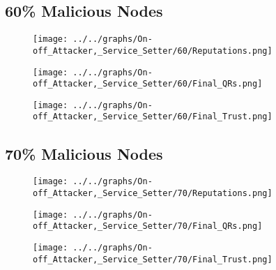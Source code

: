 \begin{minipage}[t]{0.49\columnwidth}
\subsection*{60\% Malicious Nodes}
    \begin{figure}[H]
        \centering
        \texttt{[image: ../../graphs/On-off\_Attacker,\_Service\_Setter/60/Reputations.png]}
    \end{figure}
    \begin{figure}[H]
        \centering
        \texttt{[image: ../../graphs/On-off\_Attacker,\_Service\_Setter/60/Final\_QRs.png]}
    \end{figure}
\end{minipage}
\begin{minipage}[t]{0.49\columnwidth}
    \begin{figure}[H]
        \centering
        \texttt{[image: ../../graphs/On-off\_Attacker,\_Service\_Setter/60/Final\_Trust.png]}
    \end{figure}
\end{minipage}

\begin{minipage}[t]{0.49\columnwidth}
\subsection*{70\% Malicious Nodes}
    \begin{figure}[H]
        \centering
        \texttt{[image: ../../graphs/On-off\_Attacker,\_Service\_Setter/70/Reputations.png]}
    \end{figure}
    \begin{figure}[H]
        \centering
        \texttt{[image: ../../graphs/On-off\_Attacker,\_Service\_Setter/70/Final\_QRs.png]}
    \end{figure}
\end{minipage}
\begin{minipage}[t]{0.49\columnwidth}
    \begin{figure}[H]
        \centering
        \texttt{[image: ../../graphs/On-off\_Attacker,\_Service\_Setter/70/Final\_Trust.png]}
    \end{figure}
\end{minipage}


